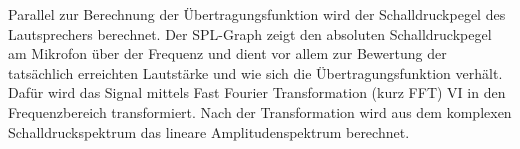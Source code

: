 Parallel zur Berechnung der Übertragungsfunktion wird der Schalldruckpegel des Lautsprechers berechnet. Der SPL-Graph zeigt den absoluten Schalldruckpegel am Mikrofon über der Frequenz und dient vor allem zur Bewertung der tatsächlich erreichten Lautstärke und wie sich die Übertragungsfunktion verhält.
Dafür wird das Signal mittels Fast Fourier Transformation (kurz FFT) VI in den Frequenzbereich transformiert. Nach der Transformation wird aus dem komplexen Schalldruckspektrum das lineare Amplitudenspektrum berechnet.   












